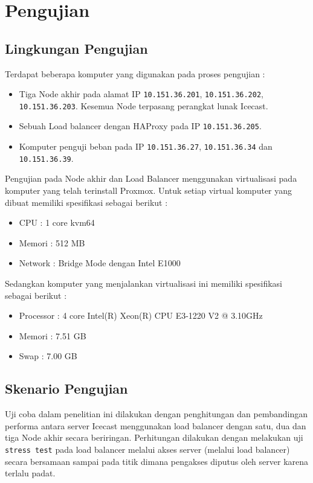 \chapter{Pengujian}

\section{Lingkungan Pengujian}
Terdapat beberapa komputer yang digunakan pada proses pengujian :
\begin{itemize}
\item Tiga Node akhir pada alamat IP \texttt{10.151.36.201}, \texttt{10.151.36.202}, \texttt{10.151.36.203}. Kesemua Node terpasang perangkat lunak Icecast.
\item Sebuah Load balancer dengan HAProxy pada IP \texttt{10.151.36.205}.
\item Komputer penguji beban pada IP \texttt{10.151.36.27}, \texttt{10.151.36.34} dan \texttt{10.151.36.39}.
\end{itemize}

Pengujian pada Node akhir dan Load Balancer menggunakan virtualisasi pada komputer yang telah terinstall Proxmox. Untuk setiap virtual komputer yang dibuat memiliki spesifikasi sebagai berikut :

\begin{itemize}
    \item CPU \tabto{2cm} : 1 core kvm64
    \item Memori \tabto{2cm} : 512 MB
    \item Network \tabto{2cm} : Bridge Mode dengan Intel E1000
\end{itemize}

Sedangkan komputer yang menjalankan virtualisasi ini memiliki spesifikasi sebagai berikut :

\begin{itemize}
    \item Processor \tabto{2cm} : 4 core Intel(R) Xeon(R) CPU E3-1220 V2 @ 3.10GHz
    \item Memori \tabto{2cm} : 7.51 GB
    \item Swap \tabto{2cm} : 7.00 GB
\end{itemize}


\section{Skenario Pengujian}
Uji coba dalam penelitian ini dilakukan dengan penghitungan dan pembandingan performa antara server Icecast menggunakan load balancer dengan satu, dua dan tiga Node akhir secara beriringan. Perhitungan dilakukan dengan melakukan uji \texttt{stress test} pada load balancer melalui akses server (melalui load balancer) secara bersamaan sampai pada titik dimana pengakses diputus oleh server karena terlalu padat. 

